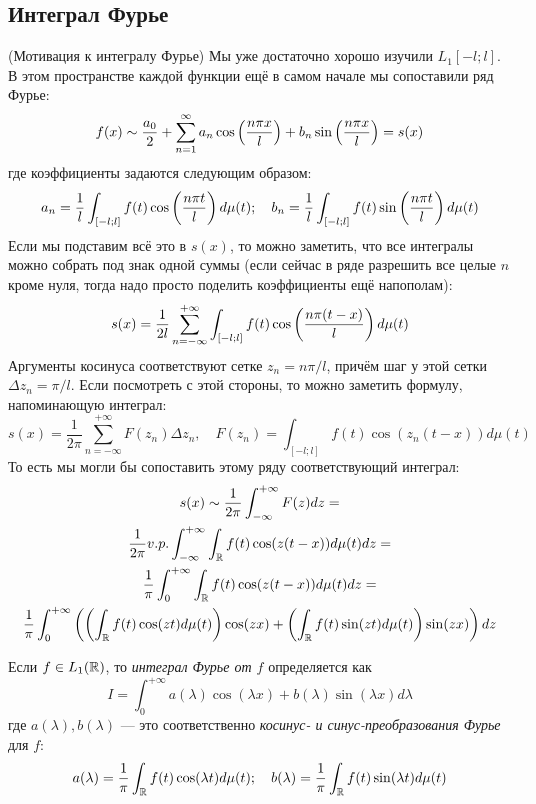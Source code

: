 \subsection{Интеграл Фурье}

\begin{note} (Мотивация к интегралу Фурье)
	Мы уже достаточно хорошо изучили $L_1[-l; l]$. В этом пространстве каждой функции ещё в самом начале мы сопоставили ряд Фурье:
	\[
		f(x) \sim \frac{a_0}{2} + \sum_{n = 1}^\infty a_n \cos\left(\frac{n\pi x}{l}\right) + b_n\sin\left(\frac{n\pi x}{l}\right) = s(x)
	\]
	где коэффициенты задаются следующим образом:
	\[
		a_n = \frac{1}{l}\int_{[-l; l]} f(t)\cos\left(\frac{n\pi t}{l}\right)d\mu(t); \quad b_n = \frac{1}{l}\int_{[-l; l]} f(t)\sin\left(\frac{n\pi t}{l}\right)d\mu(t)
	\]
	Если мы подставим всё это в $s(x)$, то можно заметить, что все интегралы можно собрать под знак одной суммы (если сейчас в ряде разрешить все целые $n$ кроме нуля, тогда надо просто поделить коэффициенты ещё напополам):
	\[
		s(x) = \frac{1}{2l} \sum_{n = -\infty}^{+\infty} \int_{[-l; l]} f(t)\cos\left(\frac{n\pi(t - x)}{l}\right)d\mu(t)
	\]
	Аргументы косинуса соответствуют сетке $z_n = n\pi / l$, причём шаг у этой сетки $\Delta z_n = \pi / l$. Если посмотреть с этой стороны, то можно заметить формулу, напоминающую интеграл:
	\[
		s(x) = \frac{1}{2\pi} \sum_{n = -\infty}^{+\infty} F(z_n)\Delta z_n, \quad F(z_n) = \int_{[-l; l]} f(t)\cos(z_n(t - x))d\mu(t)
	\]
	То есть мы могли бы сопоставить этому ряду соответствующий интеграл:
	\begin{multline*}
		s(x) \sim \frac{1}{2\pi} \int_{-\infty}^{+\infty} F(z)dz =
		\\
		\frac{1}{2\pi} v.p. \int_{-\infty}^{+\infty} \int_{\mathbb{R}} f(t)\cos(z(t - x))d\mu(t)dz =
		\\
		\frac{1}{\pi} \int_0^{+\infty} \int_{\mathbb{R}} f(t)\cos(z(t - x))d\mu(t)dz =
		\\
		\frac{1}{\pi} \int_0^{+\infty} \left(\left(\int_{\mathbb{R}} f(t)\cos(zt)d\mu(t)\right)\cos(zx) + \left(\int_{\mathbb{R}} f(t)\sin(zt)d\mu(t)\right)\sin(zx)\right)dz
	\end{multline*}
\end{note}

\begin{definition}
	Если $f \in L_1(\mathbb{R})$, то \textit{интеграл Фурье от $f$} определяется как
	\[
		I = \int_0^{+\infty} a(\lambda)\cos(\lambda x) + b(\lambda)\sin(\lambda x)d\lambda
	\]
	где $a(\lambda), b(\lambda)$ --- это соответственно \textit{косинус- и синус-преобразования Фурье} для $f$:
	\[
		a(\lambda) = \frac{1}{\pi} \int_{\mathbb{R}} f(t)\cos(\lambda t)d\mu(t); \quad b(\lambda) = \frac{1}{\pi} \int_{\mathbb{R}} f(t)\sin(\lambda t)d\mu(t)
	\]
\end{definition}

